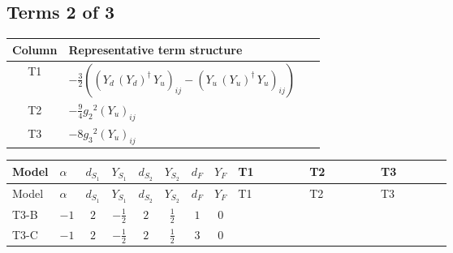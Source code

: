 \documentclass[8pt]{article}
\begin{document}
\begin{landscape}
\subsection*{Terms 2 of 3}
\begin{center}
\begin{tabular}{@{}c >{\raggedright\arraybackslash}p{0.82\linewidth}@{}}
\toprule
Column & Representative term structure \\
\midrule
T1 & \(\displaystyle -\frac{3}{2} (\left({Y_d}\,\left({Y_d}\right)^{\dagger}\,{Y_u}\right)_{ij}-\left({Y_u}\,\left({Y_u}\right)^{\dagger}\,{Y_u}\right)_{ij})\) \\
\midrule
T2 & \(\displaystyle -\frac{9}{4} {g_2}^2 \left({Y_u}\right)_{ij}\) \\
\midrule
T3 & \(\displaystyle -8 {g_3}^2 \left({Y_u}\right)_{ij}\) \\
\midrule
\bottomrule
\end{tabular}
\end{center}
\smallskip
\tiny
\begin{longtable}{@{}llcccccc >{\raggedright\arraybackslash}p{0.21\linewidth} >{\raggedright\arraybackslash}p{0.21\linewidth} >{\raggedright\arraybackslash}p{0.21\linewidth}@{}}
\toprule
Model & $\alpha$ & $d_{S_1}$ & $Y_{S_1}$ & $d_{S_2}$ & $Y_{S_2}$ & $d_F$ & $Y_F$ & T1 & T2 & T3 \\
\midrule
\endfirsthead
\toprule
Model & $\alpha$ & $d_{S_1}$ & $Y_{S_1}$ & $d_{S_2}$ & $Y_{S_2}$ & $d_F$ & $Y_F$ & T1 & T2 & T3 \\
\midrule
\endhead
T3-B & $-1$ & $2$ & $-\frac{1}{2}$ & $2$ & $\frac{1}{2}$ & $1$ & $0$ & \scriptsize\adjustbox{max width=\linewidth}{$\begin{gathered} -\frac{3}{2} (\left({Y_d}\,\left({Y_d}\right)^{\dagger}\,{Y_u}\right)_{ij}-\left({Y_u}\,\left({Y_u}\right)^{\dagger}\,{Y_u}\right)_{ij})\end{gathered}$} & \scriptsize\adjustbox{max width=\linewidth}{$\begin{gathered} -\frac{9}{4} {g_2}^2 \left({Y_u}\right)_{ij}\end{gathered}$} & \scriptsize\adjustbox{max width=\linewidth}{$\begin{gathered} -8 {g_3}^2 \left({Y_u}\right)_{ij}\end{gathered}$} \\
\midrule
T3-C & $-1$ & $2$ & $-\frac{1}{2}$ & $2$ & $\frac{1}{2}$ & $3$ & $0$ & \scriptsize\adjustbox{max width=\linewidth}{$\begin{gathered} -\frac{3}{2} (\left({Y_d}\,\left({Y_d}\right)^{\dagger}\,{Y_u}\right)_{ij}-\left({Y_u}\,\left({Y_u}\right)^{\dagger}\,{Y_u}\right)_{ij})\end{gathered}$} & \scriptsize\adjustbox{max width=\linewidth}{$\begin{gathered} -\frac{9}{4} {g_2}^2 \left({Y_u}\right)_{ij}\end{gathered}$} & \scriptsize\adjustbox{max width=\linewidth}{$\begin{gathered} -8 {g_3}^2 \left({Y_u}\right)_{ij}\end{gathered}$} \\

\end{longtable}
\end{landscape}
\end{document}
